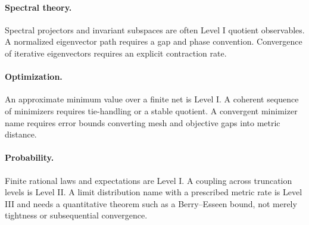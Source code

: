 \paragraph{Spectral theory.}
Spectral projectors and invariant subspaces are often Level I quotient observables.  A normalized eigenvector path requires a gap and phase convention.  Convergence of iterative eigenvectors requires an explicit contraction rate.

\paragraph{Optimization.}
An approximate minimum value over a finite net is Level I.  A coherent sequence of minimizers requires tie-handling or a stable quotient.  A convergent minimizer name requires error bounds converting mesh and objective gaps into metric distance.

\paragraph{Probability.}
Finite rational laws and expectations are Level I.  A coupling across truncation levels is Level II.  A limit distribution name with a prescribed metric rate is Level III and needs a quantitative theorem such as a Berry--Esseen bound, not merely tightness or subsequential convergence.
